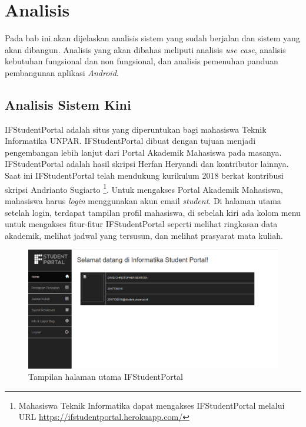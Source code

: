\chapter{Analisis}
\label{chap:analisis}

Pada bab ini akan dijelaskan analisis sistem yang sudah berjalan dan sistem yang akan dibangun. Analisis yang akan dibahas meliputi analisis \textit{use case}, analisis kebutuhan fungsional dan non fungsional, dan analisis pemenuhan panduan pembangunan aplikasi \textit{Android}.

\section{Analisis Sistem Kini}
% 
IFStudentPortal adalah situs yang diperuntukan bagi mahasiswa Teknik Informatika UNPAR\cite{herfan:15:portal}. IFStudentPortal dibuat dengan tujuan menjadi pengembangan lebih lanjut dari Portal Akademik Mahasiswa pada masanya. IFStudentPortal adalah hasil skripsi Herfan Heryandi \cite{herfan:15:portal} dan kontributor lainnya. Saat ini IFStudentPortal telah mendukung kurikulum 2018 berkat kontribusi skripsi Andrianto Sugiarto \cite{andrianto:18:portalsiam}\footnote{Mahasiswa Teknik Informatika dapat mengakses IFStudentPortal melalui URL \url{https://ifstudentportal.herokuapp.com/}}. Untuk mengakses Portal Akademik Mahasiswa, mahasiswa harus \textit{login} menggunakan akun email \textit{student}. Di halaman utama setelah login, terdapat tampilan profil mahasiswa, di sebelah kiri ada kolom menu untuk mengakses fitur-fitur IFStudentPortal seperti melihat ringkasan data akademik, melihat jadwal yang tersusun, dan melihat prasyarat mata kuliah.
\begin{figure}[H]
				\centering
				\includegraphics[scale=0.5]{Gambar/home}
				\caption{Tampilan halaman utama IFStudentPortal} 
				\label{fig:ifstudpor_home}
			\end{figure}

